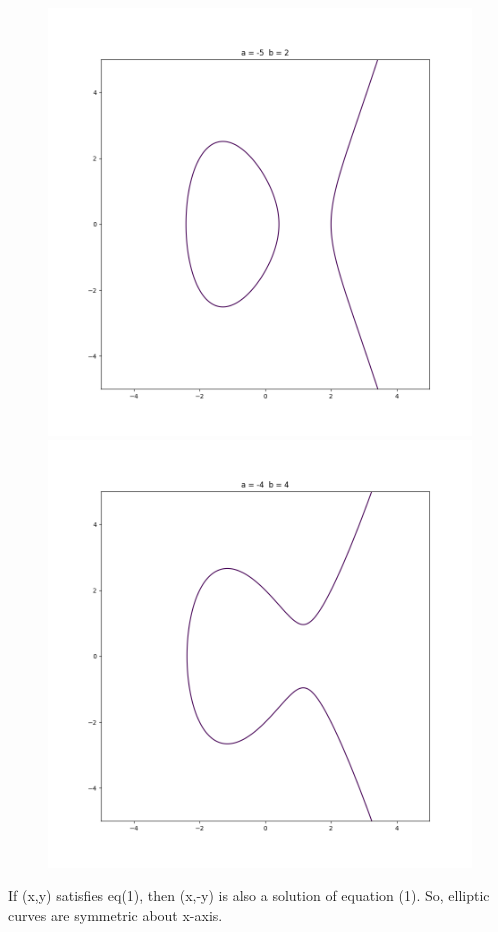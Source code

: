\documentclass[12pt,a4paper]{report}
\begin{document}
\begin{figure}[h!]
\includegraphics[scale=0.32]{Figure_3}
\includegraphics[scale=0.32]{Figure_4}
\end{figure}
\cleardoublepage
If (x,y) satisfies eq(1), then (x,-y) is also a solution of equation (1). So, elliptic curves are symmetric about x-axis. \\
\end{document}

